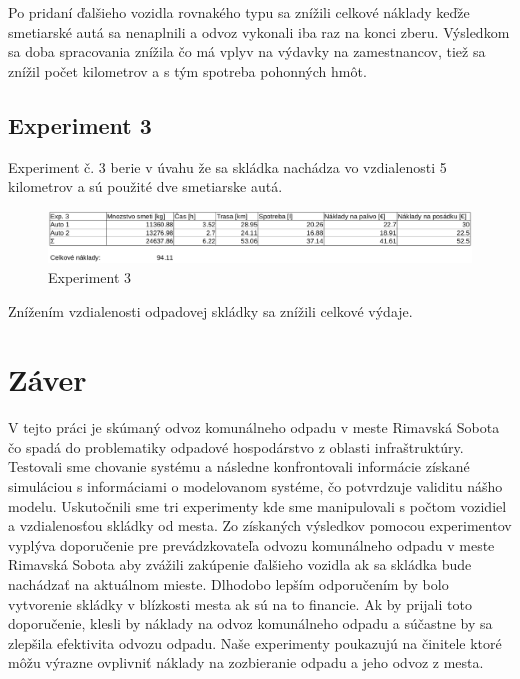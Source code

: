 \documentclass[11pt,a4paper]{article}
\begin{document}
        Po pridaní ďalšieho vozidla rovnakého typu sa znížili celkové náklady keďže smetiarské autá sa nenaplnili a odvoz vykonali iba raz na konci zberu. Výsledkom sa doba spracovania znížila čo má vplyv na výdavky na zamestnancov, tiež sa znížil počet kilometrov a s tým spotreba pohonných hmôt. 

    \subsection{Experiment 3}

        Experiment č. 3 berie v úvahu že sa skládka nachádza vo vzdialenosti 5 kilometrov a sú použité dve smetiarske autá.

\begin{figure}[h]
    \center
    \includegraphics[scale=0.3]{img/exp3.eps}
    \caption{Experiment 3}
    \label{E3}
\end{figure}

    Znížením vzdialenosti odpadovej skládky sa znížili celkové výdaje.

\newpage

\section{Záver}

    \indent V tejto práci je skúmaný odvoz komunálneho odpadu v meste Rimavská Sobota čo spadá do problematiky odpadové hospodárstvo z oblasti infraštruktúry. Testovali sme chovanie systému a následne konfrontovali informácie získané simuláciou s informáciami o modelovanom systéme, čo potvrdzuje validitu nášho modelu. Uskutočnili sme tri experimenty kde sme manipulovali s počtom vozidiel a vzdialenosťou skládky od mesta. Zo získaných výsledkov pomocou experimentov vyplýva doporučenie pre prevádzkovateľa odvozu komunálneho odpadu v meste Rimavská Sobota aby zvážili zakúpenie ďalšieho vozidla ak sa skládka bude nachádzať na aktuálnom mieste. Dlhodobo lepším odporučením by bolo  vytvorenie skládky v blízkosti mesta ak sú na to financie. Ak by prijali toto doporučenie, klesli by náklady na odvoz komunálneho odpadu a súčastne by sa zlepšila efektivita odvozu odpadu. Naše experimenty poukazujú na činitele ktoré môžu výrazne ovplivniť náklady na zozbieranie odpadu a jeho odvoz z mesta.
\end{document}
